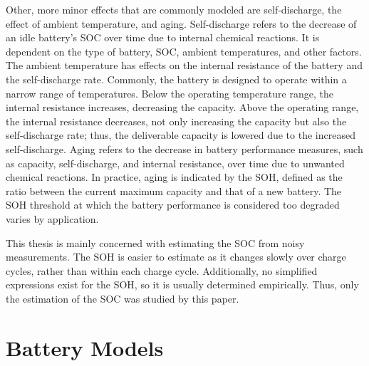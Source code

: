 \documentclass[../zhang_thesis.tex]{subfiles}
\begin{document}
Other, more minor effects that are commonly modeled are self-discharge, the effect of ambient temperature, and aging. Self-discharge refers to the decrease of an idle battery's SOC over time due to internal chemical reactions. It is dependent on the type of battery, SOC, ambient temperatures, and other factors. The ambient temperature has effects on the internal resistance of the battery and the self-discharge rate. Commonly, the battery is designed to operate within a narrow range of
temperatures. Below the operating temperature range, the internal resistance increases, decreasing the capacity. Above the operating range, the internal resistance decreases, not only increasing the capacity but also the self-discharge rate; thus, the deliverable capacity is lowered due to the increased self-discharge. Aging refers to the decrease in battery performance measures, such as capacity, self-discharge, and internal resistance, over time due to unwanted chemical reactions. In
practice, aging is indicated by the SOH, defined as the ratio between the current maximum capacity and that of a new battery. The SOH threshold at which the battery performance is considered too degraded varies by application.

This thesis is mainly concerned with estimating the SOC from noisy measurements. The SOH is easier to estimate as it changes slowly over charge cycles, rather than within each charge cycle. Additionally, no simplified expressions exist for the SOH, so it is usually determined empirically. Thus, only the estimation of the SOC was studied by this paper.



\section{Battery Models}
\end{document}
